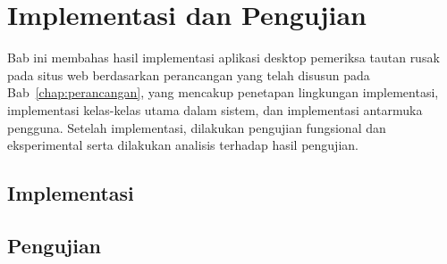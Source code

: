 \chapter{Implementasi dan Pengujian}
\label{chap:implementasi-dan-pengujian}

Bab ini membahas hasil implementasi aplikasi desktop pemeriksa tautan rusak pada situs web berdasarkan perancangan yang telah disusun pada Bab~\ref{chap:perancangan}, yang mencakup penetapan lingkungan implementasi, implementasi kelas-kelas utama dalam sistem, dan implementasi antarmuka pengguna. Setelah implementasi, dilakukan pengujian fungsional dan eksperimental serta dilakukan analisis terhadap hasil pengujian.

\section{Implementasi}
\label{sec:05-implementasi}



\section{Pengujian}
\label{sec:05-pengujian}




